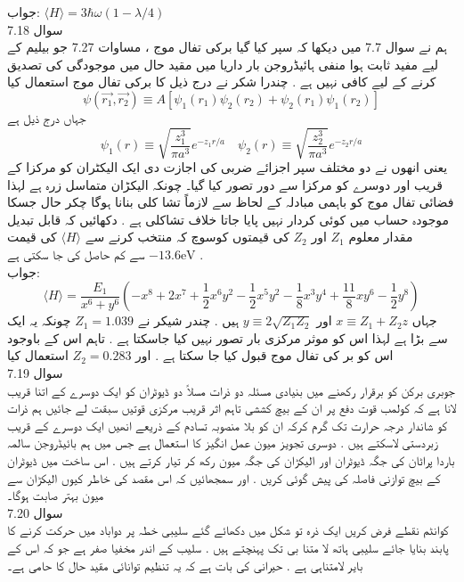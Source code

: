 جواب:
\(\langle H \rangle =3\hbar\omega(1-\lambda/4)\)\\
سوال 
7.18\\
ہم نے سوال 7.7 میں دیکھا کہ سپر کیا گیا برکی تفال موج ، مساوات 7.27 جو بیلیم کے لیے مفید ثابت ہوا منفی ہائیڈروجن بار داریا میں مقید حال میں موجودگی کی تصدیق کرنے کے لیے کافی نہیں ہے . چندرا شكر نے درج ذیل کا برکی تفال موج استعمال کیا
\[\psi(\vec{r_{1}},\vec{r_{2}})\equiv A[\psi_{1}(r_{1})\psi_{2}(r_{2})+\psi_{2}(r_{1})\psi_{1}(r_{2})]\]
جہاں درج ذیل ہے
\[\psi_{1}(r)\equiv \sqrt{\frac{z_{1}^{3}}{\pi a^{3}}}e^{-z_{1}r/a}  \quad  \psi_{2}(r)\equiv \sqrt{\frac{z_{2}^{3}}{\pi a^{3}}}e^{-z_{2}r/a}\] 
یعنی انھوں نے دو مختلف سپر اجزائے ضربی کی اجازت دی ایک الیکٹران کو مرکزا کے قریب اور دوسرے کو مرکزا سے دور تصور کیا گیا۔ چونکہ الیکڑان متماسل زرہ ہے لہذا فضائی تفال موج کو باہمی مبادلہ کے لحاظ سے لازماً  تشا کلی بنانا ہوگا چکر حال جسکا موجودہ حساب میں کوئی کردار نہیں پایا جاتا خلاف تشاکلی ہے . دکھائیں کہ قابل تبدیل مقدار معلوم
\(Z_{1}\)
اور
\(Z_{2}\)
کی قیمتوں کوسوچ کہ منتخب کرنے سے
\(\langle H \rangle \) 
کی قیمت
\(-13.6\text{eV}\)
سے کم حاصل کی جا سکتی ہے .\\
جواب:
\[\langle H \rangle = \frac{E_{1}}{x^{6}+y^{6}}(-x^{8}+2x^{7}+\frac{1}{2}x^{6}y^{2}-\frac{1}{2}x^{5}y^{2}-\frac{1}{8}x^{3}y^{4}+\frac{11}{8}xy^{6}-\frac{1}{2}y^{8})\]
جہاں
\(x\equiv Z_{1}+Z_{2}z\)
اور
\(y\equiv2\sqrt{Z_{1}Z_{2}}\)
ہیں . چندر شیکر نے
\(Z_{1}=1.039\)
چونکہ یہ ایک سے بڑا ہے لہذا اس کو موثر مرکزی بار تصور نہیں کیا جاسکتا  ہے . تاہم اس کے باوجود اس کو بر کی تفال موج قبول کیا جا سکتا ہے . اور
\(Z_{2}=0.283\)
استعمال کیا\\
سوال 
7.19\\
جوبری برکن کو برقرار رکھنے میں بنیادی مسئلہ دو ذرات مسلاً دو ڈیوٹران کو ایک دوسرے کے اتنا قریب لانا ہے کہ کولمب قوت دفع پر ان کے بیچ کششی تاہم اثر قریب مرکزی قوتیں سبقت لے جائیں ہم ذرات کو شاندار درجہ حرارت تک گرم کرکہ ان کو بلا منصوبہ تسادم کے ذریعے انھیں ایک دوسرے کے قریب زبردستی لاسکتے ہیں . دوسری تجویز میون عمل انگیز کا استعمال ہے جس میں ہم بائیڈروجن سالمہ باردا پراٹان کی جگہ ڈیوٹران اور الیکڑان کی جگہ میون رکھ کر تیار کرتے ہیں . اس ساخت میں ڈیوٹران کے بیچ توازنی فاصلہ کی پیش گوئی کریں . اور سمجھائیں کہ اس مقصد کی خاطر کیوں الیکڑان سے میون بہتر صابت ہوگا۔\\
سوال 
7.20\\
کوانٹم نقطے فرض کریں ایک ذرہ تو شکل    میں دکھائے گئے سلیبی خطہ پر دواباد میں حرکت کرنے کا پابند بنایا جائے سلیبی ہاتھ لا متنا بی تک پہنچتے ہیں . سلیب کے اندر مخفیا صفر ہے جو کہ اس کے بایر لامتناہی ہے . حیرانی کی بات ہے کہ یہ تنظیم توانائی مقید حال کا حامی ہے۔

